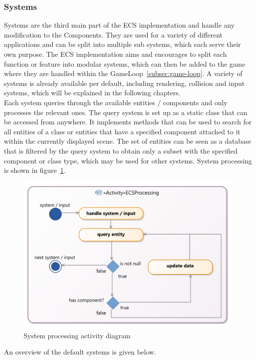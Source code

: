 \subsubsection{Systems}\label{subsubsec:systems}
Systems are the third main part of the ECS implementation and handle any modification to the Components.
They are used for a variety of different applications and can be split into multiple sub systems, which each serve their own purpose.
The ECS implementation aims and encourages to split each function or feature into modular systems, which can then be added to the game where they are handled within the GameLoop~\ref{subsec:game-loop}.
A variety of systems is already available per default, including rendering, collision and input systems, which will be explained in the following chapters.
\\
Each system queries through the available entities / components and only processes the relevant ones.
The query system is set up as a static class that can be accessed from anywhere.
It implements methods that can be used to search for all entities of a class or entities that have a specified component
attached to it within the currently displayed scene.
The set of entities can be seen as a database that is filtered by the query system to obtain only a subset with the specified component or class type, which may be used
for other systems.
System processing is shown in figure~\ref{fig:ecs-system-processing}.
\begin{figure}
    \centering
    \includegraphics[width=\textwidth]{Pictures/res/implementation/ecs-system-processing}
    \caption{System processing activity diagram}
    \label{fig:ecs-system-processing}
\end{figure}
An overview of the default systems is given below.


